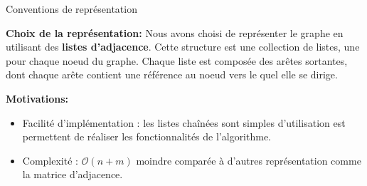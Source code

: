 \begin{frame}[allowframebreaks]{Conventions de représentation}

\textbf{Choix de la représentation: }Nous avons choisi de représenter le graphe en utilisant des \textbf{listes d'adjacence}. Cette structure est une collection de listes, une pour chaque noeud du graphe. Chaque liste est composée des arêtes sortantes, dont chaque arête contient une référence au noeud vers le quel elle se dirige.


\textbf{Motivations: } 
\begin{itemize}
\item Facilité d'implémentation : les listes chaînées sont simples d'utilisation est permettent de réaliser les fonctionnalités de l'algorithme.
\item Complexité :  $\mathcal{O}(n+m)$ moindre comparée à d'autres représentation comme la matrice d'adjacence.
\end{itemize}

\end{frame}

